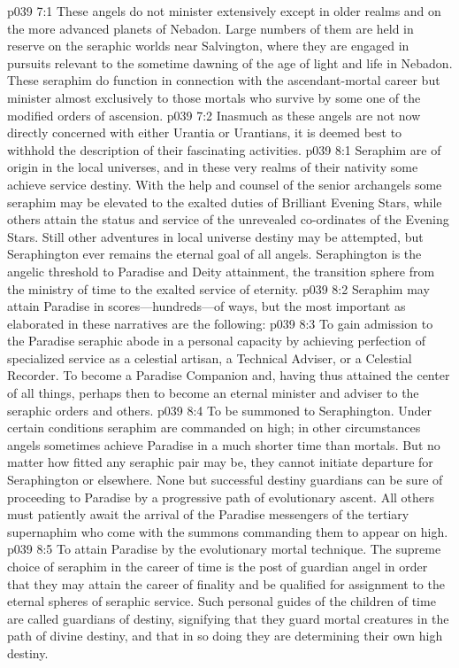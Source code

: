 \vs p039 7:1 These angels do not minister extensively except in older realms and on the more advanced planets of Nebadon. Large numbers of them are held in reserve on the seraphic worlds near Salvington, where they are engaged in pursuits relevant to the sometime dawning of the age of light and life in Nebadon. These seraphim do function in connection with the ascendant\hyp{}mortal career but minister almost exclusively to those mortals who survive by some one of the modified orders of ascension.
\vs p039 7:2 Inasmuch as these angels are not now directly concerned with either Urantia or Urantians, it is deemed best to withhold the description of their fascinating activities.
\vs p039 8:1 Seraphim are of origin in the local universes, and in these very realms of their nativity some achieve service destiny. With the help and counsel of the senior archangels some seraphim may be elevated to the exalted duties of Brilliant Evening Stars, while others attain the status and service of the unrevealed co\hyp{}ordinates of the Evening Stars. Still other adventures in local universe destiny may be attempted, but Seraphington ever remains the eternal goal of all angels. Seraphington is the angelic threshold to Paradise and Deity attainment, the transition sphere from the ministry of time to the exalted service of eternity.
\pc \vs p039 8:2 Seraphim may attain Paradise in scores---hundreds---of ways, but the most important as elaborated in these narratives are the following:
\pc \vs p039 8:3 \bibnobreakspace To gain admission to the Paradise seraphic abode in a personal capacity by achieving perfection of specialized service as a celestial artisan, a Technical Adviser, or a Celestial Recorder. To become a Paradise Companion and, having thus attained the center of all things, perhaps then to become an eternal minister and adviser to the seraphic orders and others.
\pc \vs p039 8:4 \bibnobreakspace To be summoned to Seraphington. Under certain conditions seraphim are commanded on high; in other circumstances angels sometimes achieve Paradise in a much shorter time than mortals. But no matter how fitted any seraphic pair may be, they cannot initiate departure for Seraphington or elsewhere. None but successful destiny guardians can be sure of proceeding to Paradise by a progressive path of evolutionary ascent. All others must patiently await the arrival of the Paradise messengers of the tertiary supernaphim who come with the summons commanding them to appear on high.
\pc \vs p039 8:5 \bibnobreakspace To attain Paradise by the evolutionary mortal technique. The supreme choice of seraphim in the career of time is the post of guardian angel in order that they may attain the career of finality and be qualified for assignment to the eternal spheres of seraphic service. Such personal guides of the children of time are called guardians of destiny, signifying that they guard mortal creatures in the path of divine destiny, and that in so doing they are determining their own high destiny.
